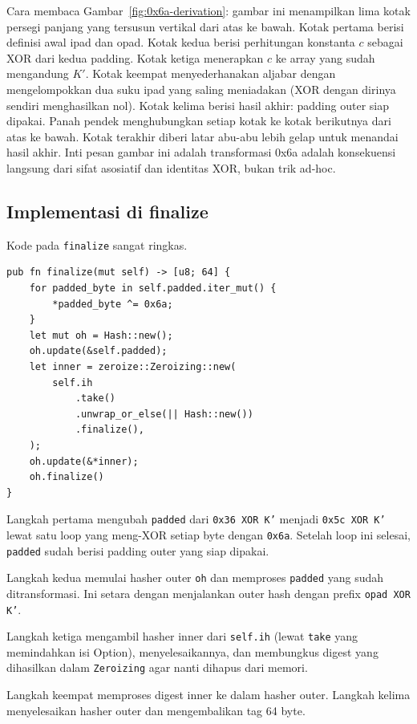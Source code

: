 \documentclass[11pt,a4paper]{article}
\begin{document}
Cara membaca Gambar~\ref{fig:0x6a-derivation}: gambar ini menampilkan lima kotak persegi panjang yang tersusun vertikal dari atas ke bawah. Kotak pertama berisi definisi awal ipad dan opad. Kotak kedua berisi perhitungan konstanta $c$ sebagai XOR dari kedua padding. Kotak ketiga menerapkan $c$ ke array yang sudah mengandung $K'$. Kotak keempat menyederhanakan aljabar dengan mengelompokkan dua suku ipad yang saling meniadakan (XOR dengan dirinya sendiri menghasilkan nol). Kotak kelima berisi hasil akhir: padding outer siap dipakai. Panah pendek menghubungkan setiap kotak ke kotak berikutnya dari atas ke bawah. Kotak terakhir diberi latar abu-abu lebih gelap untuk menandai hasil akhir. Inti pesan gambar ini adalah transformasi 0x6a adalah konsekuensi langsung dari sifat asosiatif dan identitas XOR, bukan trik ad-hoc.

\subsection{Implementasi di finalize}

Kode pada \texttt{finalize} sangat ringkas.

\begin{lstlisting}[style=code]
pub fn finalize(mut self) -> [u8; 64] {
    for padded_byte in self.padded.iter_mut() {
        *padded_byte ^= 0x6a;
    }
    let mut oh = Hash::new();
    oh.update(&self.padded);
    let inner = zeroize::Zeroizing::new(
        self.ih
            .take()
            .unwrap_or_else(|| Hash::new())
            .finalize(),
    );
    oh.update(&*inner);
    oh.finalize()
}
\end{lstlisting}

Langkah pertama mengubah \texttt{padded} dari \texttt{0x36 XOR K'} menjadi \texttt{0x5c XOR K'} lewat satu loop yang meng-XOR setiap byte dengan \texttt{0x6a}. Setelah loop ini selesai, \texttt{padded} sudah berisi padding outer yang siap dipakai.

Langkah kedua memulai hasher outer \texttt{oh} dan memproses \texttt{padded} yang sudah ditransformasi. Ini setara dengan menjalankan outer hash dengan prefix \texttt{opad XOR K'}.

Langkah ketiga mengambil hasher inner dari \texttt{self.ih} (lewat \texttt{take} yang memindahkan isi Option), menyelesaikannya, dan membungkus digest yang dihasilkan dalam \texttt{Zeroizing} agar nanti dihapus dari memori.

Langkah keempat memproses digest inner ke dalam hasher outer. Langkah kelima menyelesaikan hasher outer dan mengembalikan tag 64 byte.
\end{document}
